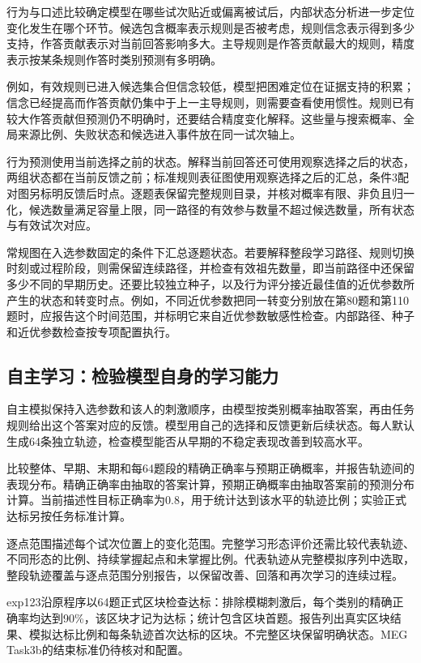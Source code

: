 \documentclass[12pt]{article}
\begin{document}
行为与口述比较确定模型在哪些试次贴近或偏离被试后，内部状态分析进一步定位变化发生在哪个环节。候选包含概率表示规则是否被考虑，规则信念表示得到多少支持，作答贡献表示对当前回答影响多大。主导规则是作答贡献最大的规则，精度表示按某条规则作答时类别预测有多明确。

例如，有效规则已进入候选集合但信念较低，模型把困难定位在证据支持的积累；信念已经提高而作答贡献仍集中于上一主导规则，则需要查看使用惯性。规则已有较大作答贡献但预测仍不明确时，还要结合精度变化解释。这些量与搜索概率、全局来源比例、失败状态和候选进入事件放在同一试次轴上。

行为预测使用当前选择之前的状态。解释当前回答还可使用观察选择之后的状态，两组状态都在当前反馈之前；标准规则表征图使用观察选择之后的汇总，条件3配对图另标明反馈后时点。逐题表保留完整规则目录，并核对概率有限、非负且归一化，候选数量满足容量上限，同一路径的有效参与数量不超过候选数量，所有状态与有效试次对应。

常规图在入选参数固定的条件下汇总逐题状态。若要解释整段学习路径、规则切换时刻或过程阶段，则需保留连续路径，并检查有效祖先数量，即当前路径中还保留多少不同的早期历史。还要比较独立种子，以及行为评分接近最佳值的近优参数所产生的状态和转变时点。例如，不同近优参数把同一转变分别放在第80题和第110题时，应报告这个时间范围，并标明它来自近优参数敏感性检查。内部路径、种子和近优参数检查按专项配置执行。

\subsection{自主学习：检验模型自身的学习能力}
\label{sec:evaluation-5}

自主模拟保持入选参数和该人的刺激顺序，由模型按类别概率抽取答案，再由任务规则给出这个答案对应的反馈。模型用自己的选择和反馈更新后续状态。每人默认生成64条独立轨迹，检查模型能否从早期的不稳定表现改善到较高水平。

比较整体、早期、末期和每64题段的精确正确率与预期正确概率，并报告轨迹间的表现分布。精确正确率由抽取的答案计算，预期正确概率由抽取答案前的预测分布计算。当前描述性目标正确率为0.8，用于统计达到该水平的轨迹比例；实验正式达标另按任务标准计算。

逐点范围描述每个试次位置上的变化范围。完整学习形态评价还需比较代表轨迹、不同形态的比例、持续掌握起点和未掌握比例。代表轨迹从完整模拟序列中选取，整段轨迹覆盖与逐点范围分别报告，以保留改善、回落和再次学习的连续过程。

exp123沿原程序以64题正式区块检查达标：排除模糊刺激后，每个类别的精确正确率均达到90\%，该区块才记为达标；统计包含区块首题。报告列出真实区块结果、模拟达标比例和每条轨迹首次达标的区块。不完整区块保留明确状态。MEG Task3b的结束标准仍待核对和配置。
\end{document}
